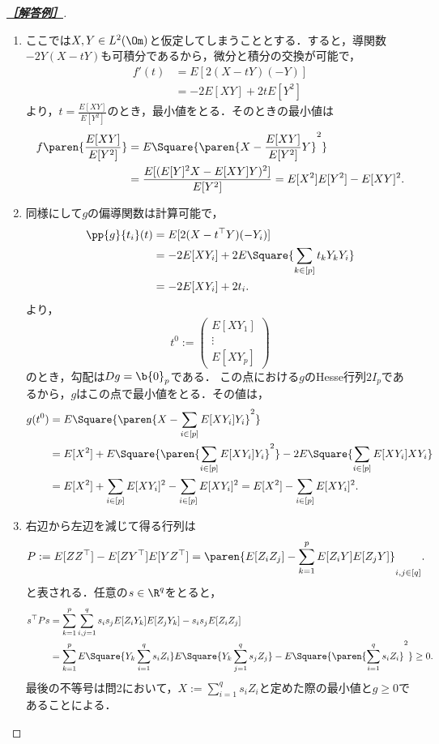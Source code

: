 \documentclass[uplatex,dvipdfmx]{jsarticle}
\begin{document}
\begin{proof}[\textbf{\underline{［解答例］}}]\mbox{}
    \begin{enumerate}
        \item ここでは$X,Y\in L^2(\Om)$と仮定してしまうこととする．すると，導関数$-2Y(X-tY)$も可積分であるから，微分と積分の交換が可能で，
        \begin{align*}
            f'(t)&=E[2(X-tY)(-Y)]\\
            &=-2E[XY]+2tE[Y^2]
        \end{align*}
        より，$t=\frac{E[XY]}{E[Y^2]}$のとき，最小値をとる．そのときの最小値は
        \begin{align*}
            f\paren{\frac{E[XY]}{E[Y^2]}}&=E\Square{\paren{X-\frac{E[XY]}{E[Y^2]}Y}^2}\\
            &=\frac{E[(E[Y]^2X-E[XY]Y)^2]}{E[Y^2]}=E[X^2]E[Y^2]-E[XY]^2.
        \end{align*}
        \item 同様にして$g$の偏導関数は計算可能で，
        \begin{align*}
            \pp{g}{t_i}(t)&=E[2(X-t^\top Y)(-Y_i)]\\
            &=-2E[XY_i]+2E\Square{\sum_{k\in[p]}t_kY_kY_i}\\
            &=-2E[XY_i]+2t_i.
        \end{align*}
        より，
        \[t^0:=\begin{pmatrix}E[XY_1]\\\vdots\\E[XY_p]\end{pmatrix}\]
        のとき，勾配は$Dg=\b{0}_p$である．
        この点における$g$のHesse行列$2I_p$であるから，$g$はこの点で最小値をとる．その値は，
        \begin{align*}
            g(t^0)&=E\Square{\paren{X-\sum_{i\in[p]}E[XY_i]Y_i}^2}\\
            &=E[X^2]+E\Square{\paren{\sum_{i\in[p]}E[XY_i]Y_i}^2}-2E\Square{\sum_{i\in[p]}E[XY_i]XY_i}\\
            &=E[X^2]+\sum_{i\in[p]}E[XY_i]^2-\sum_{i\in[p]}E[XY_i]^2=E[X^2]-\sum_{i\in[p]}E[XY_i]^2.
        \end{align*}
        \item 右辺から左辺を減じて得る行列は
        \[P:=E[ZZ^\top]-E[ZY^\top]E[YZ^\top]=\paren{E[Z_iZ_j]-\sum_{k=1}^pE[Z_iY]E[Z_jY]}_{i,j\in[q]}.\]
        と表される．任意の$s\in\R^q$をとると，
        \begin{align*}
            s^\top Ps&=\sum_{k=1}^p\sum_{i,j=1}^qs_is_jE[Z_iY_k]E[Z_jY_k]-s_is_jE[Z_iZ_j]\\
            &=\sum_{k=1}^pE\Square{Y_k\sum_{i=1}^qs_iZ_i}E\Square{Y_k\sum_{j=1}^qs_jZ_j}-E\Square{\paren{\sum_{i=1}^qs_iZ_i}^2}\ge0.
        \end{align*}
        最後の不等号は問2において，$X:=\sum_{i=1}^qs_iZ_i$と定めた際の最小値と$g\ge0$であることによる．
    \end{enumerate}
\end{proof}
\end{document}
